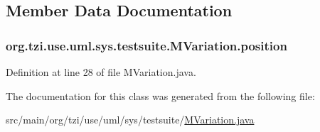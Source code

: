 \subsection{Member Data Documentation}
\hypertarget{classorg_1_1tzi_1_1use_1_1uml_1_1sys_1_1testsuite_1_1_m_variation_ac0dcd46ba8930c9c0096defe6db93ff3}{
\subsubsection[{position}]{ org.\-tzi.\-use.\-uml.\-sys.\-testsuite.\-M\-Variation.\-position\hspace{0.3cm}{\ttfamily [protected]}}}\label{classorg_1_1tzi_1_1use_1_1uml_1_1sys_1_1testsuite_1_1_m_variation_ac0dcd46ba8930c9c0096defe6db93ff3}


Definition at line 28 of file M\-Variation.\-java.



The documentation for this class was generated from the following file\-:\begin{DoxyCompactItemize}
\item 
src/main/org/tzi/use/uml/sys/testsuite/\hyperlink{_m_variation_8java}{M\-Variation.\-java}\end{DoxyCompactItemize}
